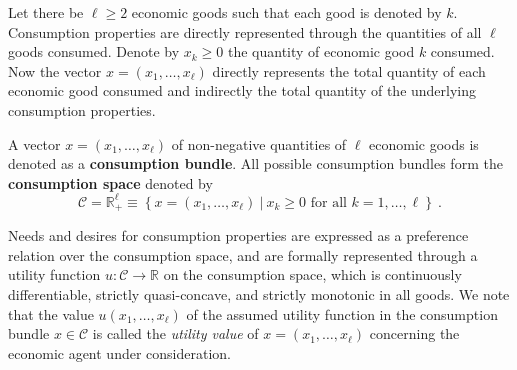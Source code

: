 Let there be $\ell \geqslant 2$ economic goods such that each good is denoted by $k$. Consumption properties are directly represented through the quantities of all $\ell$ goods consumed. Denote by $x_{k} \geqslant 0$ the quantity of economic good $k$ consumed. Now the vector $x = \left( x_{1}, \ldots, x_{\ell} \right)$ directly represents the total quantity of each economic good consumed and indirectly the total quantity of the underlying consumption properties.
\begin{definition}
A vector $x = \left( x_{1}, \ldots, x_{\ell} \right)$ of non-negative quantities of $\ell$ economic goods is denoted as a \textbf{consumption bundle}. All possible consumption bundles form the \textbf{consumption space} denoted by
\begin{equation}
\mathcal{C} = \mathbb{R}_{+}^{\ell} \equiv \left\{ x = \left( x_{1}, \ldots, x_{\ell} \right) ~ | ~ x_{k} \geqslant 0 \mbox{ for all } k = 1, \ldots, \ell \right\} ~ .
\end{equation}
\end{definition}
Needs and desires for consumption properties are expressed as a preference relation over the consumption space, and are formally represented through a utility function $u \colon \mathcal{C} \rightarrow \mathbb{R}$ on the consumption space, which is continuously differentiable, strictly quasi-concave, and strictly monotonic in all goods. We note that the value $u \left( x_{1}, \ldots , x_{\ell} \right)$ of the assumed utility function in the consumption bundle $x \in \mathcal{C}$ is called the \emph{utility value} of $x = \left( x_{1}, \ldots , x_{\ell} \right)$ concerning the economic agent under consideration.

